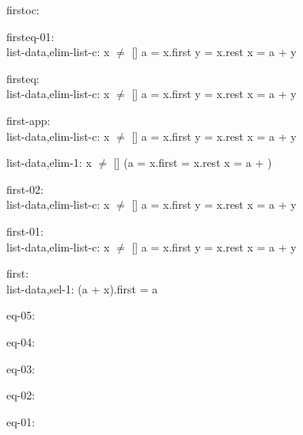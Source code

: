 \documentclass[a4paper]{article}
\begin{document}
\bigskip

firstoc:\\ 

\bigskip

firsteq-01:\\ list-data,elim-list-c: 
x $\neq$ []
 \Fol a = x.first \And y = x.rest \Equiv x = a + y



\bigskip

firsteq:\\ list-data,elim-list-c: 
x $\neq$ []
 \Fol a = x.first \And y = x.rest \Equiv x = a + y



\bigskip

first-app:\\ list-data,elim-list-c: 
x $\neq$ []
 \Fol a = x.first \And y = x.rest \Equiv x = a + y



list-data,elim-1: 
 \Fol x $\neq$ [] \Imp (a = x.first \And {} = x.rest \Equiv x = a + )



\bigskip

first-02:\\ list-data,elim-list-c: 
x $\neq$ []
 \Fol a = x.first \And y = x.rest \Equiv x = a + y



\bigskip

first-01:\\ list-data,elim-list-c: 
x $\neq$ []
 \Fol a = x.first \And y = x.rest \Equiv x = a + y



\bigskip

first:\\ list-data,sel-1: 
 \Fol (a + x).first = a



\bigskip

eq-05:\\ 

\bigskip

eq-04:\\ 

\bigskip

eq-03:\\ 

\bigskip

eq-02:\\ 

\bigskip

eq-01:\\ 
\end{document}
